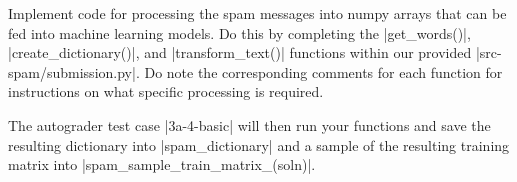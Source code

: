 \item {}
Implement code for processing the spam messages into numpy arrays that can be fed into machine learning models. Do this by completing the |get_words()|, |create_dictionary()|, and |transform_text()| functions within our provided |src-spam/submission.py|. Do note the corresponding comments for each function for instructions on what specific processing is required.

The autograder test case |3a-4-basic| will then run your functions and save the resulting dictionary into |spam_dictionary| and a sample of the resulting training matrix into |spam_sample_train_matrix_(soln)|.

